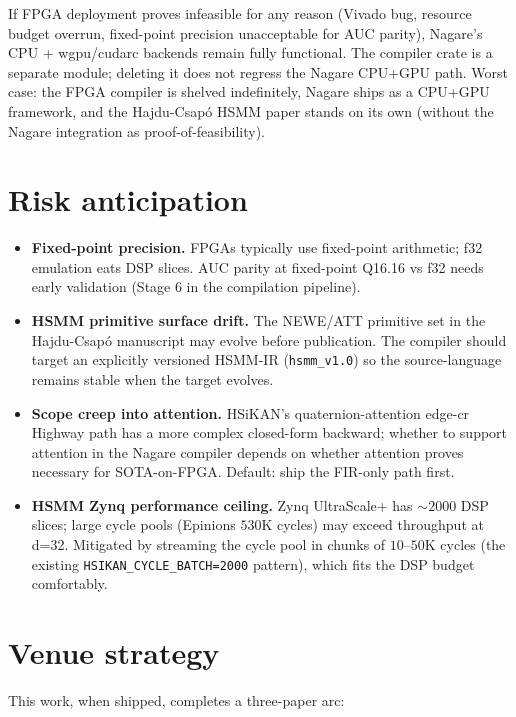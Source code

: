 \documentclass[11pt]{article}
\begin{document}
If FPGA deployment proves infeasible for any reason (Vivado bug,
resource budget overrun, fixed-point precision unacceptable for
AUC parity), Nagare's CPU + wgpu/cudarc backends remain fully
functional. The compiler crate is a separate module; deleting it
does not regress the Nagare CPU+GPU path. Worst case: the FPGA
compiler is shelved indefinitely, Nagare ships as a CPU+GPU
framework, and the Hajdu-Csapó HSMM paper stands on its own
(without the Nagare integration as proof-of-feasibility).

\section{Risk anticipation}

\begin{itemize}
  \item \textbf{Fixed-point precision.} FPGAs typically use
    fixed-point arithmetic; f32 emulation eats DSP slices.
    AUC parity at fixed-point Q16.16 vs f32 needs early validation
    (Stage 6 in the compilation pipeline).
  \item \textbf{HSMM primitive surface drift.} The NEWE/ATT
    primitive set in the Hajdu-Csapó manuscript may evolve before
    publication. The compiler should target an explicitly versioned
    HSMM-IR (\texttt{hsmm\_v1.0}) so the source-language remains
    stable when the target evolves.
  \item \textbf{Scope creep into attention.} HSiKAN's
    quaternion-attention edge-cr Highway path has a more complex
    closed-form backward; whether to support attention in the
    Nagare compiler depends on whether attention proves necessary
    for SOTA-on-FPGA. Default: ship the FIR-only path first.
  \item \textbf{HSMM Zynq performance ceiling.} Zynq UltraScale+
    has $\sim 2000$ DSP slices; large cycle pools (Epinions $530$K
    cycles) may exceed throughput at d=32. Mitigated by streaming
    the cycle pool in chunks of $10$--$50$K cycles (the existing
    \texttt{HSIKAN\_CYCLE\_BATCH=2000} pattern), which fits the
    DSP budget comfortably.
\end{itemize}

\section{Venue strategy}

This work, when shipped, completes a three-paper arc:
\end{document}
